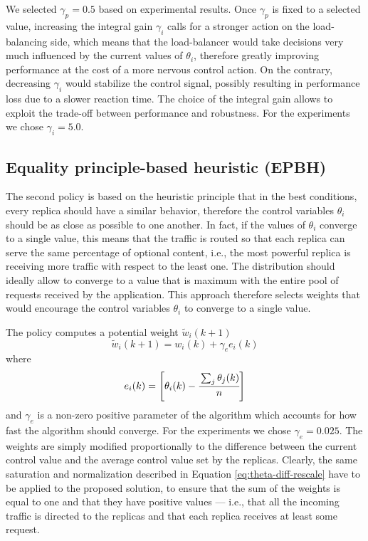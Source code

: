 We selected $\gamma_p = 0.5$ based on experimental results. Once
$\gamma_p$ is fixed to a selected value, increasing the integral gain
$\gamma_i$ calls for a stronger action on the load-balancing side,
which means that the load-balancer would take decisions very much
influenced by the current values of $\theta_i$, therefore greatly
improving performance at the cost of a more nervous control action. On
the contrary, decreasing $\gamma_i$ would stabilize the control
signal, possibly resulting in performance loss due to a slower
reaction time. The choice of the integral gain allows to exploit the
trade-off between performance and robustness. For the experiments we
chose $\gamma_i = 5.0$.

\subsection{Equality principle-based heuristic (EPBH)}

The second policy is based on the heuristic principle that in the best
conditions, every replica should have a similar behavior, therefore
the control variables $\theta_i$ should be as close as possible to one
another. In fact, if the values of $\theta_i$ converge to a single
value, this means that the traffic is routed so that each replica can
serve the same percentage of optional content, i.e., the most powerful
replica is receiving more traffic with respect to the least one. The
distribution should ideally allow to converge to a value that is
maximum with the entire pool of requests received by the
application. This approach therefore selects weights that would
encourage the control variables $\theta_i$ to converge to a single
value.

The policy computes a potential weight $\tilde{w}_i(k+1)$
\begin{equation}
  \tilde{w}_i(k+1) = w_i(k) + \gamma_e e_i(k)
\label{eq:equal-thetas}
\end{equation}
where
$$e_i(k)=\left[ \theta_i (k) - \cfrac{\sum_j \theta_j (k) }{n} \right]$$
and $\gamma_e$ is a non-zero positive parameter of the algorithm which
accounts for how fast the algorithm should converge. For the
experiments we chose $\gamma_e = 0.025$. The weights are simply
modified proportionally to the difference between the current control
value and the average control value set by the replicas. Clearly, the
same saturation and normalization described in Equation
\eqref{eq:theta-diff-rescale} have to be applied to the proposed
solution, to ensure that the sum of the weights is equal to one and
that they have positive values --- i.e., that all the incoming traffic
is directed to the replicas and that each replica receives at least
some request.

